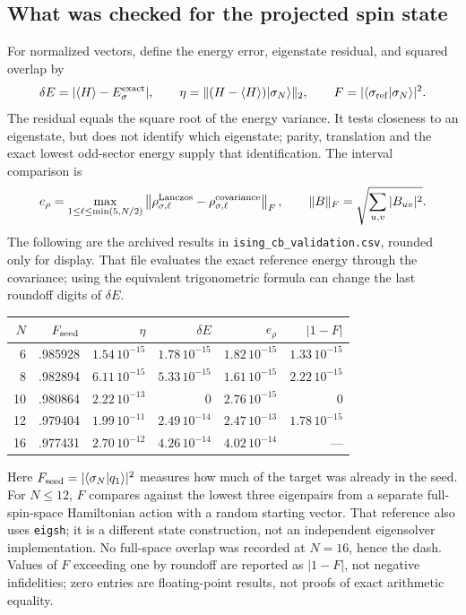 \subsection{What was checked for the projected spin state}
\label{sec:ising-spin-validation}
For normalized vectors, define the energy error, eigenstate residual,
and squared overlap by
\begin{equation}
 \delta E=|\langle H\rangle-E_\sigma^{\rm exact}|,\qquad
 \eta=\|(H-\langle H\rangle)\lvert \sigma_N\rangle\|_2,\qquad
 F=|\langle\sigma_{\rm ref}|\sigma_N\rangle|^2.
\end{equation}
The residual equals the square root of the energy variance. It tests
closeness to an eigenstate, but does not identify which eigenstate;
parity, translation and the exact lowest odd-sector energy supply that
identification. The interval comparison is
\begin{equation}
 e_\rho=\max_{1\leq\ell\leq\min(5,N/2)}
 \left\|\rho^{\rm Lanczos}_{\sigma,\ell}
       -\rho^{\rm covariance}_{\sigma,\ell}\right\|_F,
 \qquad \|B\|_F=\sqrt{\sum_{u,v}|B_{uv}|^2}.
\end{equation}
The following are the archived results in
\texttt{ising\_cb\_validation.csv}, rounded only for display.
That file evaluates the exact reference energy through the covariance;
using the equivalent trigonometric formula can change the last
roundoff digits of $\delta E$.
\begin{center}\small
\begin{tabular}{rrrrrr}\toprule
$N$ & $F_{\rm seed}$ & $\eta$ & $\delta E$ & $e_\rho$ & $|1-F|$\\\midrule
6 & .985928 & $1.54\,10^{-15}$ & $1.78\,10^{-15}$ & $1.82\,10^{-15}$ & $1.33\,10^{-15}$\\
8 & .982894 & $6.11\,10^{-15}$ & $5.33\,10^{-15}$ & $1.61\,10^{-15}$ & $2.22\,10^{-15}$\\
10 & .980864 & $2.22\,10^{-13}$ & $0$ & $2.76\,10^{-15}$ & $0$\\
12 & .979404 & $1.99\,10^{-11}$ & $2.49\,10^{-14}$ & $2.47\,10^{-13}$ & $1.78\,10^{-15}$\\
16 & .977431 & $2.70\,10^{-12}$ & $4.26\,10^{-14}$ & $4.02\,10^{-14}$ & ---\\\bottomrule
\end{tabular}
\end{center}
Here $F_{\rm seed}=|\langle\sigma_N|q_1\rangle|^2$ measures how much
of the target was already in the seed. For $N\leq12$, $F$ compares
against the lowest three eigenpairs from a separate full-spin-space
Hamiltonian action with a random starting vector. That reference also
uses \texttt{eigsh}; it is a different state construction, not an
independent eigensolver implementation. No full-space overlap was
recorded at $N=16$, hence the dash. Values of $F$ exceeding one by
roundoff are reported as $|1-F|$, not negative infidelities; zero entries
are floating-point results, not proofs of exact arithmetic equality.

